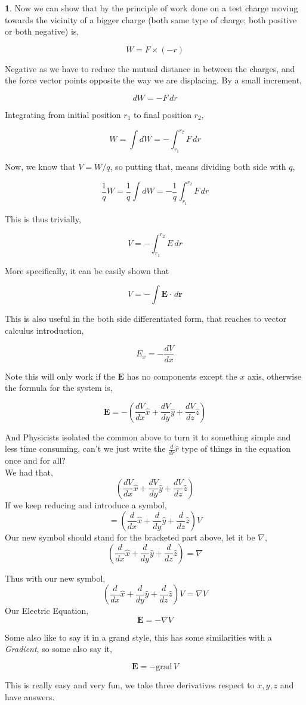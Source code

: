 \documentclass[11pt,a4paper,twocolumn]{article}
\renewcommand{\vec}[1]{\boldsymbol{#1}}
\theoremstyle{definition}
\newtheorem{fct}{ \framebox[0.05\textwidth]{Fact} }
\theoremstyle{definition}
\theoremstyle{definition}
\theoremstyle{definition}
\begin{document}
\begin{fct}
Now we can show that by the principle of work done on a test charge moving towards the vicinity of a bigger charge (both same type of charge; both positive or both negative) is,

\[ W = F \times (-r) \]

Negative as we have to reduce the mutual distance in between the charges, and the force vector points opposite the way we are displacing. By a small increment,

\[ dW = - F \, dr \]

Integrating from initial position $r_1$ to final position $r_2$, 

\[ W = \int dW = -\int_{r_1}^{r_2} F \, dr \]

Now, we know that $ V = W/q $, so putting that, means dividing both side with $q$, 

\[ \frac{1}{q} W = \frac{1}{q} \int dW = -\frac{1}{q} \int_{r_1}^{r_2} F \, dr \]

This is thus trivially, 

\[ V = -  \int_{r_1}^{r_2} E \, dr \]

More specifically, it can be easily shown that 

\[ V = - \int \vec{E} \cdot \, d\vec{r} \]

This is also useful in the both side differentiated form, that reaches to vector calculus introduction,

\[ E_x = - \frac{dV}{dx} \]

Note this will only work if the $\vec{E}$ has no components except the $x$ axis, otherwise the formula for the system is,

\[ \vec{E} = - \left(	\frac{dV}{dx} \hat{x} + \frac{dV}{dy} \hat{y} + \frac{dV}{dz} \hat{z}\right)  \]

And Physicists isolated the common above to turn it to something simple and less time consuming, can't we just write the $\frac{d}{dr} \hat{r} $ type of things in the equation once and for all? \\
We had that,
\[ \left(	\frac{dV}{dx} \hat{x} + \frac{dV}{dy} \hat{y} + \frac{dV}{dz} \hat{z}\right)  \]
If we keep reducing and introduce a symbol,
 \[ = \left(	\frac{d}{dx} \hat{x} + \frac{d}{dy} \hat{y} + \frac{d}{dz} \hat{z} \right) V \]
 Our new symbol should stand for the bracketed part above, let it be $\nabla$,
 \[ \left(	\frac{d}{dx} \hat{x}+ \frac{d}{dy} \hat{y} + \frac{d}{dz} \hat{z} \right) = \nabla \]
 
 Thus with our new symbol, 
 \[ \left(	\frac{d}{dx} \hat{x} + \frac{d}{dy} \hat{y} + \frac{d}{dz} \hat{z} \right) V = \nabla V \]
 Our Electric Equation, 
\[ \vec{E} = - \nabla V \]

Some also like to say it in a grand style, this has some similarities with a \emph{Gradient}, so some also say it, 

\[ \vec{E} = - \mathrm{grad} \, V \]
 
 This is really easy and very fun, we take three derivatives respect to $x,y,z$ and have answers.
 \end{fct}
\end{document}
